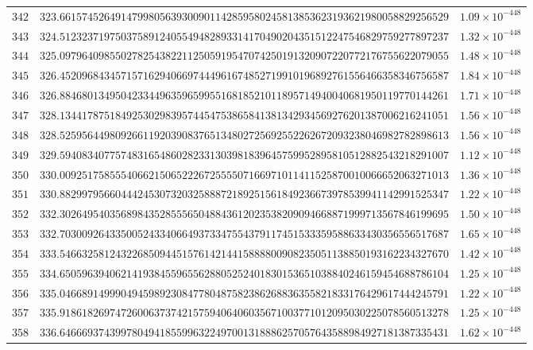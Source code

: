 \documentclass[12pt,reqno]{amsart}
\theoremstyle{remark}
\begin{document}
\begin{longtable}{clc}
$342$ & $323.6615745264914799805639300901142859580245813853623193621980058829256529$ & $1.09\times 10^{-448}$ \\
$343$ & $324.5123237197503758912405549482893314170490204351512247546829759277897237$ & $1.32\times 10^{-448}$ \\
$344$ & $325.0979640985502782543822112505919547074250191320907220772176755622079055$ & $1.48\times 10^{-448}$ \\
$345$ & $326.4520968434571571629406697444961674852719910196892761556466358346756587$ & $1.84\times 10^{-448}$ \\
$346$ & $326.8846801349504233449635965995516818521011895714940040681950119770144261$ & $1.71\times 10^{-448}$ \\
$347$ & $328.1344178751849253029839574454753865841381342934569276201387006216241051$ & $1.56\times 10^{-448}$ \\
$348$ & $328.5259564498092661192039083765134802725692552262672093238046982782898613$ & $1.56\times 10^{-448}$ \\
$349$ & $329.5940834077574831654860282331303981839645759952895810512882543218291007$ & $1.12\times 10^{-448}$ \\
$350$ & $330.0092517585554066215065222672555507166971011411525870010066652063271013$ & $1.36\times 10^{-448}$ \\
$351$ & $330.8829979566044424530732032588872189251561849236673978539941142991525347$ & $1.22\times 10^{-448}$ \\
$352$ & $332.3026495403568984352855565048843612023538209094668871999713567846199695$ & $1.50\times 10^{-448}$ \\
$353$ & $332.7030092643350052433406649373347554379117451533359588633430356556517687$ & $1.65\times 10^{-448}$ \\
$354$ & $333.5466325812432268509445157614214415888800908235051138850193162234327670$ & $1.42\times 10^{-448}$ \\
$355$ & $334.6505963940621419384559655628805252401830153651038840246159454688786104$ & $1.25\times 10^{-448}$ \\
$356$ & $335.0466891499904945989230847780487582386268836355821833176429617444245791$ & $1.22\times 10^{-448}$ \\
$357$ & $335.9186182697472600637374215759406406035671003771012095030225078560513278$ & $1.25\times 10^{-448}$ \\
$358$ & $336.6466693743997804941855996322497001318886257057643588984927181387335431$ & $1.62\times 10^{-448}$ \\

\end{longtable}
\end{document}
